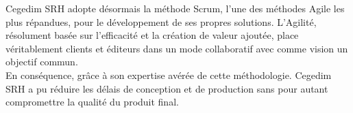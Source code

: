 Cegedim SRH adopte désormais la méthode Scrum, l'une des méthodes Agile les plus répandues, pour le développement de ses propres solutions. L'Agilité, résolument basée sur l'efficacité et la création de valeur ajoutée, place véritablement clients et éditeurs dans un mode collaboratif avec comme vision un objectif commun.\\

En conséquence, grâce à son expertise avérée de cette méthodologie. Cegedim SRH a pu réduire les délais de conception et de production sans pour autant compromettre la qualité du produit final.
